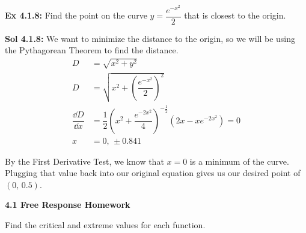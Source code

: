\begin{tcolorbox}[example]
    \textbf{Ex 4.1.8: } Find the point on the curve $y = \dfrac{e^{-x^2}}{2}$ that is closest to the origin. 
\end{tcolorbox}
\begin{tcolorbox}[solution]
    \textbf{Sol 4.1.8: } We want to minimize the distance to the origin, so we will be using the Pythagorean Theorem to find the distance. \begin{align*}
        D &= \sqrt{x^2 + y^2} \\[11pt]
        D &= \sqrt{x^2 + \left(\dfrac{e^{-x^2}}{2}\right)^2} \\[11pt]
        \dfrac{\dd D}{\dd x} &= \dfrac{1}{2}\left(x^2 + \dfrac{e^{-2x^2}}{4}\right)^{-\frac{1}{2}}\left(2x - xe^{-2x^2}\right) = 0 \\[11pt]
        x &= 0, \, \pm 0.841
    \end{align*}
    \begin{center}
    \end{center}
    By the First Derivative Test, we know that $x = 0$ is a minimum of the curve. Plugging that value back into our original equation gives us our desired point of $\boxed{(0, \, 0.5)}$. 
\end{tcolorbox}

\newpage

\textbf{\large{4.1 Free Response Homework}} \par

Find the critical and extreme values for each function. \par


